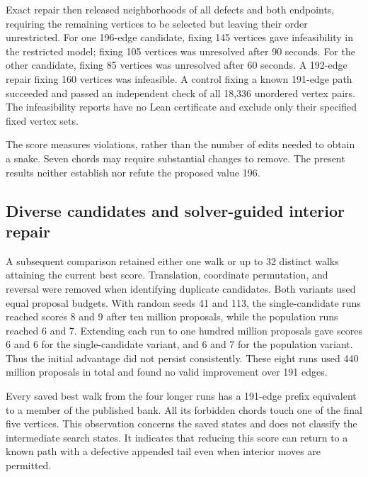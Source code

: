 \documentclass[11pt,a4paper]{article}
\theoremstyle{definition}
\theoremstyle{remark}
\begin{document}
Exact repair then released neighborhoods of all defects and both endpoints, requiring the remaining vertices to be selected but leaving their order unrestricted. For one 196-edge candidate, fixing 145 vertices gave infeasibility in the restricted model; fixing 105 vertices was unresolved after 90 seconds. For the other candidate, fixing 85 vertices was unresolved after 60 seconds. A 192-edge repair fixing 160 vertices was infeasible. A control fixing a known 191-edge path succeeded and passed an independent check of all 18,336 unordered vertex pairs. The infeasibility reports have no Lean certificate and exclude only their specified fixed vertex sets.

The score measures violations, rather than the number of edits needed to obtain a snake. Seven chords may require substantial changes to remove. The present results neither establish nor refute the proposed value 196.

\subsection{Diverse candidates and solver-guided interior repair}
A subsequent comparison retained either one walk or up to 32 distinct walks attaining the current best score. Translation, coordinate permutation, and reversal were removed when identifying duplicate candidates. Both variants used equal proposal budgets. With random seeds 41 and 113, the single-candidate runs reached scores 8 and 9 after ten million proposals, while the population runs reached 6 and 7. Extending each run to one hundred million proposals gave scores 6 and 6 for the single-candidate variant, and 6 and 7 for the population variant. Thus the initial advantage did not persist consistently. These eight runs used 440 million proposals in total and found no valid improvement over 191 edges.

Every saved best walk from the four longer runs has a 191-edge prefix equivalent to a member of the published bank. All its forbidden chords touch one of the final five vertices. This observation concerns the saved states and does not classify the intermediate search states. It indicates that reducing this score can return to a known path with a defective appended tail even when interior moves are permitted.
\end{document}
